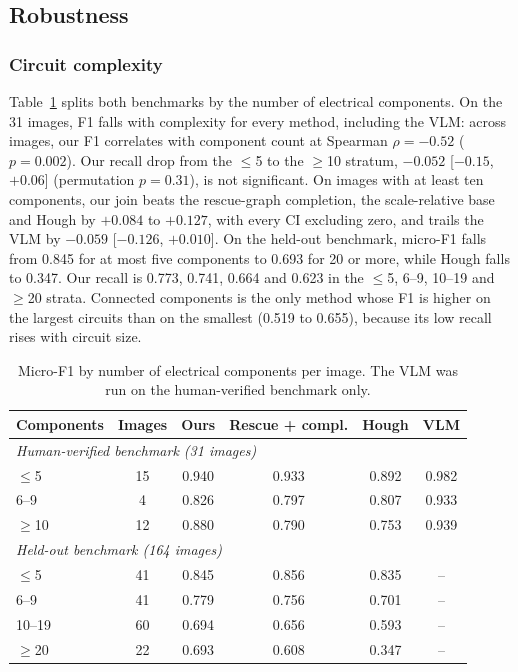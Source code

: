 \documentclass{ieeeaccess}
\begin{document}
\subsection{Robustness}
\label{sec:robustness}

\subsubsection{Circuit complexity}
Table~\ref{tab:strata} splits both benchmarks by the number of electrical components. On the 31 images, F1 falls with complexity for every method, including the VLM: across images, our F1 correlates with component count at Spearman $\rho=-0.52$ ($p=0.002$). Our recall drop from the $\leq$5 to the $\geq$10 stratum, $-0.052$ [$-0.15$, $+0.06$] (permutation $p=0.31$), is not significant. On images with at least ten components, our join beats the rescue-graph completion, the scale-relative base and Hough by $+0.084$ to $+0.127$, with every CI excluding zero, and trails the VLM by $-0.059$ [$-0.126$, $+0.010$]. On the held-out benchmark, micro-F1 falls from 0.845 for at most five components to 0.693 for 20 or more, while Hough falls to 0.347. Our recall is 0.773, 0.741, 0.664 and 0.623 in the $\leq$5, 6--9, 10--19 and $\geq$20 strata. Connected components is the only method whose F1 is higher on the largest circuits than on the smallest (0.519 to 0.655), because its low recall rises with circuit size.

\begin{table}[t]
\caption{Micro-F1 by number of electrical components per image. The VLM was run on the human-verified benchmark only.}
\label{tab:strata}
\centering
\footnotesize
\setlength{\tabcolsep}{4pt}
\begin{tabular}{lccccc}
\toprule
\textbf{Components} & \textbf{Images} & \textbf{Ours} & \textbf{Rescue + compl.} & \textbf{Hough} & \textbf{VLM} \\
\midrule
\multicolumn{6}{l}{\emph{Human-verified benchmark (31 images)}} \\
$\leq$5 & 15 & 0.940 & 0.933 & 0.892 & 0.982 \\
6--9 & 4 & 0.826 & 0.797 & 0.807 & 0.933 \\
$\geq$10 & 12 & 0.880 & 0.790 & 0.753 & 0.939 \\
\midrule
\multicolumn{6}{l}{\emph{Held-out benchmark (164 images)}} \\
$\leq$5 & 41 & 0.845 & 0.856 & 0.835 & -- \\
6--9 & 41 & 0.779 & 0.756 & 0.701 & -- \\
10--19 & 60 & 0.694 & 0.656 & 0.593 & -- \\
$\geq$20 & 22 & 0.693 & 0.608 & 0.347 & -- \\
\bottomrule
\end{tabular}
\end{table}
\end{document}
